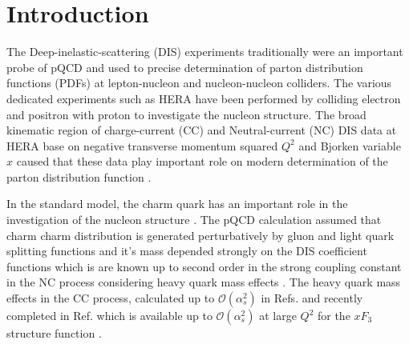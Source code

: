 \documentclass[pdftex,twocolumn,epjc3]{svjour3}          %
\begin{document}

\linenumbers

\section{Introduction}
 The Deep-inelastic-scattering (DIS) experiments traditionally were an important probe of pQCD and used to precise determination of parton distribution functions (PDFs) at lepton-nucleon and nucleon-nucleon colliders. The various dedicated experiments such as HERA have been performed by colliding electron and positron with proton to investigate the nucleon structure. The broad kinematic region of  charge-current (CC) and Neutral-current (NC) DIS data at HERA base on negative transverse momentum squared $Q^2$ and Bjorken variable $x$ caused that these data play important role on modern determination of the parton distribution function \cite{Abdolmaleki:2018jln, Abramowicz:2015mha,Gao:2017yyd}.
 
 In the standard model, the charm quark has an important role in the investigation of the nucleon structure \cite{Behnke:2015qja,Zenaiev:2016kfl,Abdolmaleki:2017wlg}. The pQCD calculation assumed that charm charm distribution is generated perturbatively by gluon and light quark splitting functions and it's mass depended strongly on the DIS coefficient functions which is are known up to second order in the strong coupling constant in the NC process considering heavy quark mass effects\cite{Laenen:1992zk,Laenen:1992xs} . The heavy quark mass effects in the CC process, calculated up to ${\mathcal{O}}(\alpha_s^2)$ in Refs. \cite{Gottschalk:1980rv,Gluck:1997sj,Blumlein:2011zu,Alekhin:2014sya} and recently completed in Ref. \cite{Berger:2016inr} which is available up to ${\mathcal{O}}(\alpha_s^2)$ at large $Q^2$ for the $xF_3$ structure function \cite{Behring:2015roa}.
 
\end{document}
